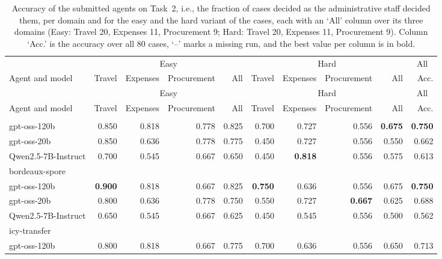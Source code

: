 {\footnotesize\setlength{\LTleft}{0pt}\setlength{\LTright}{0pt}
\begin{longtable}{@{\extracolsep{\fill}}lrrrrrrrrr@{}}
\caption{Accuracy of the submitted agents on Task~2, i.e., the fraction of cases decided as the administrative staff decided them, per domain and for the easy and the hard variant of the cases, each with an `All' column over its three domains (Easy: Travel 20, Expenses 11, Procurement 9; Hard: Travel 20, Expenses 11, Procurement 9). Column `Acc.' is the accuracy over all 80 cases, `--' marks a missing run, and the best value per column is in bold.}
\label{tab:task-02} \\
\toprule
& \multicolumn{4}{c}{Easy} & \multicolumn{4}{c}{Hard} & \multicolumn{1}{c}{All} \\
\cmidrule(lr){2-5}\cmidrule(lr){6-9}\cmidrule(lr){10-10}
Agent and model & Travel & Expenses & Procurement & All & Travel & Expenses & Procurement & All & Acc. \\
\midrule
\endfirsthead
\toprule
& \multicolumn{4}{c}{Easy} & \multicolumn{4}{c}{Hard} & \multicolumn{1}{c}{All} \\
\cmidrule(lr){2-5}\cmidrule(lr){6-9}\cmidrule(lr){10-10}
Agent and model & Travel & Expenses & Procurement & All & Travel & Expenses & Procurement & All & Acc. \\
\midrule
\endhead
\bottomrule
\endfoot
\multicolumn{10}{l}{ambitious-camera} \\*
\quad gpt-oss-120b & 0.850 & 0.818 & 0.778 & 0.825 & 0.700 & 0.727 & 0.556 & \textbf{0.675} & \textbf{0.750} \\
\quad gpt-oss-20b & 0.850 & 0.636 & 0.778 & 0.775 & 0.450 & 0.727 & 0.556 & 0.550 & 0.662 \\
\quad Qwen2.5-7B-Instruct & 0.700 & 0.545 & 0.667 & 0.650 & 0.450 & \textbf{0.818} & 0.556 & 0.575 & 0.613 \\
\midrule
\multicolumn{10}{l}{bordeaux-spore} \\*
\quad gpt-oss-120b & \textbf{0.900} & 0.818 & 0.667 & 0.825 & \textbf{0.750} & 0.636 & 0.556 & 0.675 & \textbf{0.750} \\
\quad gpt-oss-20b & 0.800 & 0.636 & 0.778 & 0.750 & 0.550 & 0.727 & \textbf{0.667} & 0.625 & 0.688 \\
\quad Qwen2.5-7B-Instruct & 0.650 & 0.545 & 0.667 & 0.625 & 0.450 & 0.545 & 0.556 & 0.500 & 0.562 \\
\midrule
\multicolumn{10}{l}{icy-transfer} \\*
\quad gpt-oss-120b & 0.800 & 0.818 & 0.667 & 0.775 & 0.700 & 0.636 & 0.556 & 0.650 & 0.713 \\

\end{longtable}}
